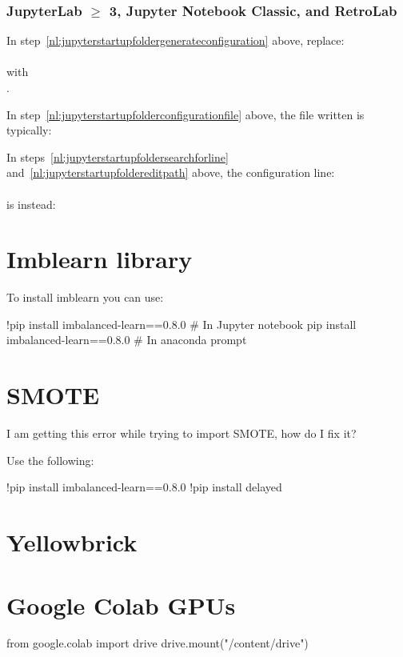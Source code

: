 	\subsubsection{JupyterLab $\geq$ 3, Jupyter Notebook Classic, and RetroLab}
	\begin{bulletedlist}
		\item In step~\ref{nl:jupyterstartupfoldergenerateconfiguration} above, replace:\\ \\ with\\ .
		\item In step~\ref{nl:jupyterstartupfolderconfigurationfile} above, the file written is typically:\\ 

		\item In steps~\ref{nl:jupyterstartupfoldersearchforline} and~\ref{nl:jupyterstartupfoldereditpath} above, the configuration line:\\ \\ is instead:\\ 
	\end{bulletedlist}


	\section{Imblearn library}
To install imblearn you can use:
	\begin{code}[\codenumbering]{}
		\codeitemnonumber !pip install imbalanced-learn==0.8.0 \# In Jupyter notebook
		\codeitemnonumber pip install imbalanced-learn==0.8.0 \# In anaconda prompt
	\end{code}


	\section{SMOTE}
I am getting this error while trying to import SMOTE, how do I fix it?

\noindent{}

Use the following:
	\begin{code}[\codenumbering]{}
		\codeitemnonumber !pip install imbalanced-learn==0.8.0
		\codeitemnonumber !pip install delayed
	\end{code}


	\section{Yellowbrick}


	\section{Google Colab GPUs}


from google.colab import drive
drive.mount("/content/drive") 